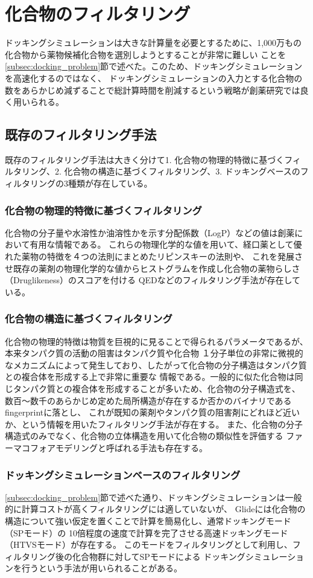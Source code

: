 \section{化合物のフィルタリング}
ドッキングシミュレーションは大きな計算量を必要とするために、1,000万もの化合物から薬物候補化合物を選別しようとすることが非常に難しい
ことを\ref{subsec:docking_problem}節で述べた。このため、ドッキングシミュレーションを高速化するのではなく、
ドッキングシミュレーションの入力とする化合物の数をあらかじめ減ずることで総計算時間を削減するという戦略が創薬研究では良く用いられる。

\subsection{既存のフィルタリング手法}\label{subsec:existing_filtering}
既存のフィルタリング手法は大きく分けて1. 化合物の物理的特徴に基づくフィルタリング、2. 化合物の構造に基づくフィルタリング、3. ドッキングベースのフィルタリングの3種類が存在している。
\subsubsection{化合物の物理的特徴に基づくフィルタリング}
化合物の分子量や水溶性か油溶性かを示す分配係数（LogP）などの値は創薬において有用な情報である。
これらの物理化学的な値を用いて、経口薬として優れた薬物の特徴を４つの法則にまとめたリピンスキーの法則\cite{Lipinski1997}や、
これを発展させ既存の薬剤の物理化学的な値からヒストグラムを作成し化合物の薬物らしさ（Druglikeness）のスコアを付ける
QED\cite{Bickerton2012}などのフィルタリング手法が存在している。
\subsubsection{化合物の構造に基づくフィルタリング}
化合物の物理的特徴は物質を巨視的に見ることで得られるパラメータであるが、本来タンパク質の活動の阻害はタンパク質や化合物
１分子単位の非常に微視的なメカニズムによって発生しており、したがって化合物の分子構造はタンパク質との複合体を形成する上で非常に重要な
情報である。一般的に似た化合物は同じタンパク質との複合体を形成することが多いため、化合物の分子構造式を、
数百～数千のあらかじめ定めた局所構造が存在するか否かのバイナリであるfingerprintに落とし、
これが既知の薬剤やタンパク質の阻害剤にどれほど近いか、という情報を用いたフィルタリング手法が存在する\cite{Nilakantan1993}。
また、化合物の分子構造式のみでなく、化合物の立体構造を用いて化合物の類似性を評価する
ファーマコフォアモデリングと呼ばれる手法も存在する\cite{Parenti2003}。
\subsubsection{ドッキングシミュレーションベースのフィルタリング}
\ref{subsec:docking_problem}節で述べた通り、ドッキングシミュレーションは一般的に計算コストが高くフィルタリングには適していないが、
Glideには化合物の構造について強い仮定を置くことで計算を簡易化し、通常ドッキングモード（SPモード）の
10倍程度の速度\cite{GlideHomePage}で計算を完了させる高速ドッキングモード（HTVSモード）が存在する。
このモードをフィルタリングとして利用し、フィルタリング後の化合物群に対してSPモードによる
ドッキングシミュレーションを行うという手法が用いられることがある\cite{Fujimoto2008}。

